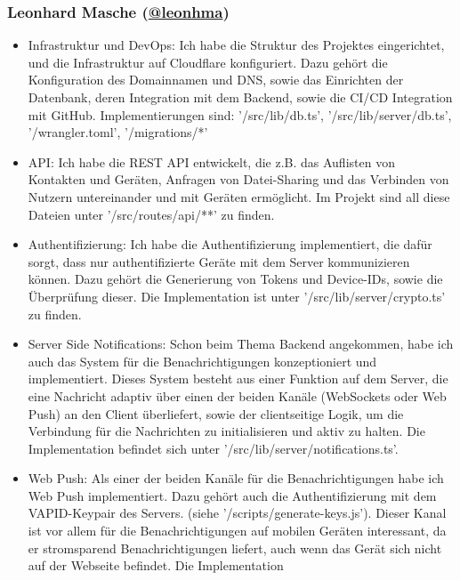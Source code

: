 \documentclass[a4paper]{article}
\begin{document}
\subsubsection{Leonhard Masche (\href{https://github.com/leonhma}{@leonhma})}
\begin{itemize}
  \item Infrastruktur und DevOps: Ich habe die Struktur des Projektes
        eingerichtet, und die Infrastruktur auf Cloudflare konfiguriert. Dazu
        gehört die Konfiguration des Domainnamen und DNS, sowie das Einrichten
        der Datenbank, deren Integration mit dem Backend, sowie die CI/CD
        Integration mit GitHub. Implementierungen sind: '/src/lib/db.ts',
        '/src/lib/server/db.ts', '/wrangler.toml', '/migrations/*'
  \item API: Ich habe die REST API entwickelt, die z.B. das Auflisten von
        Kontakten und Geräten, Anfragen von Datei-Sharing und das Verbinden von
        Nutzern untereinander und mit Geräten ermöglicht. Im Projekt sind all
        diese Dateien unter '/src/routes/api/**' zu finden.
  \item Authentifizierung: Ich habe die Authentifizierung implementiert, die
        dafür sorgt, dass nur authentifizierte Geräte mit dem Server
        kommunizieren können. Dazu gehört die Generierung von Tokens und
        Device-IDs, sowie die Überprüfung dieser. Die Implementation ist unter
        '/src/lib/server/crypto.ts' zu finden.
  \item Server Side Notifications: Schon beim Thema Backend angekommen, habe ich
        auch das System für die Benachrichtigungen konzeptioniert und
        implementiert. Dieses System besteht aus einer Funktion auf dem Server,
        die eine Nachricht adaptiv über einen der beiden Kanäle (WebSockets oder
        Web Push) an den Client überliefert, sowie der clientseitige Logik, um
        die Verbindung für die Nachrichten zu initialisieren und aktiv zu
        halten. Die Implementation befindet sich unter
        '/src/lib/server/notifications.ts'.
  \item Web Push: Als einer der beiden Kanäle für die Benachrichtigungen habe
        ich Web Push implementiert. Dazu gehört auch die Authentifizierung mit
        dem VAPID-Keypair des Servers. (siehe '/scripts/generate-keys.js').
        Dieser Kanal ist vor allem für die Benachrichtigungen auf mobilen
        Geräten interessant, da er stromsparend Benachrichtigungen liefert, auch
        wenn das Gerät sich nicht auf der Webseite befindet. Die Implementation

\end{itemize}
\end{document}
